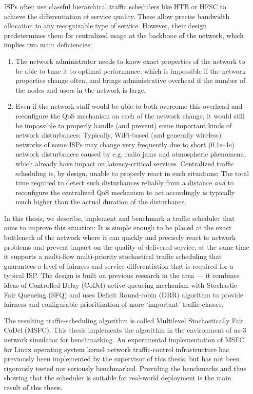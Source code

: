 ISPs often use classful hierarchical traffic schedulers like HTB or HFSC to achieve the differentiation of service quality. These allow precise bandwidth allocation to any recognizable type of service. However, their design predetermines them for centralized usage at the backbone of the network, which implies two main deficiencies:
\begin{enumerate}
\item The network administrator needs to know exact properties of the network to be able to tune it to optimal performance, which is impossible if the network properties change often, and brings administrative overhead if the number of the nodes and users in the network is large.
\item Even if the network staff would be able to both overcome this overhead and reconfigure the QoS mechanism on each of the network change, it would still be impossible to properly handle (and prevent) some important kinds of network disturbances: Typically, WiFi-based (and generally wireless) networks of some ISPs may change very frequently due to short (0.1s--1s) network disturbances caused by e.g. radio jams and atmospheric phenomena, which already have impact on latency-critical services. Centralized traffic scheduling is, by design, unable to properly react in such situations: The total time required to detect such disturbances reliably from a distance \emph{and} to reconfigure the centralized QoS mechanism to act accordingly is typically much higher than the actual duration of the disturbance.
\end{enumerate}

In this thesis, we describe, implement and benchmark a traffic scheduler that aims to improve this situation: It is simple enough to be placed at the exact bottleneck of the network where it can quickly and precisely react to network problems and prevent impact on the quality of delivered service; at the same time it supports a multi-flow multi-priority stochastical traffic scheduling that guarantees a level of fairness and service differentiation that is required for a typical ISP. The design is built on previous research in the area --- it combines ideas of Controlled Delay (CoDel) active queueing mechanism with Stochastic Fair Queueing (SFQ) and uses Deficit Round-robin (DRR) algorithm to provide fairness and configurable prioritization of more `important' traffic classes. 

The resulting traffic-scheduling algorithm is called Multilevel Stochastically Fair CoDel (MSFC). This thesis implements the algorithm in the environment of ns-3 network simulator  for benchmarking. An experimental implementation of MSFC for Linux operating system kernel network traffic-control infrastructure has previously been implemented by the supervisor of this thesis, but has not been rigorously tested nor seriously benchmarked. Providing the benchmarks and thus showing that the scheduler is suitable for real-world deployment is the main result of this thesis.


